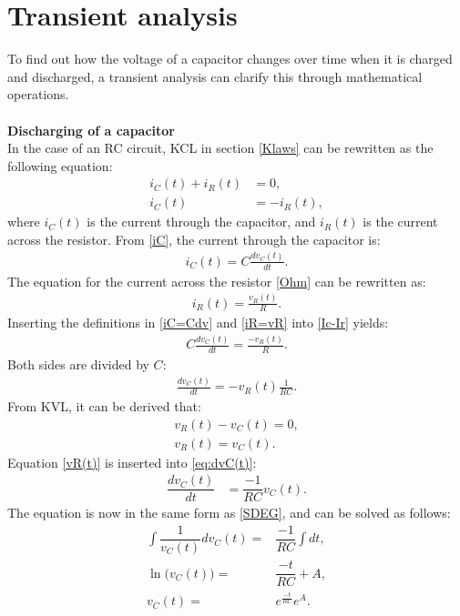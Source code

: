\section{Transient analysis}
\label{sec371}
To find out how the voltage of a capacitor changes over time when it is charged and discharged, a transient analysis can clarify this through mathematical operations.
\\
\\
\noindent\textbf{Discharging of a capacitor}\\
In the case of an RC circuit, KCL in section \ref{Klaws} can be rewritten as the following equation:
\begin{align}
i_{C}(t)+i_{R}(t)&=0, \nonumber \\
i_{C}(t)&= -i_{R}(t), \label{Ic-Ir}
\end{align}
where $i_C(t)$ is the current through the capacitor, and $i_R(t)$ is the current across the resistor. From \eqref{iC}, the current through the capacitor is:
\begin{align}
	i_C(t) = C\frac{dv_C(t)}{dt}.\label{iC=Cdv}
\end{align}
The equation for the current across the resistor \eqref{Ohm} can be rewritten as:
\begin{align}
	i_R(t) = \frac{v_R(t)}{R}. \label{iR=vR}
\end{align}
Inserting the definitions in \eqref{iC=Cdv} and \eqref{iR=vR} into \eqref{Ic-Ir} yields:
\begin{align*}
	C\frac{dv_C(t)}{dt} = \frac{-v_R(t)}{R}.
\end{align*}
Both sides are divided by $C$:
\begin{align}
	\frac{dv_C(t)}{dt} =-v_R(t) \frac{1}{RC}.
	\label{eq:dvC(t)}
\end{align}
From KVL, it can be derived that:
\begin{align}
	v_R(t) - v_C(t) = 0, \nonumber\\
	v_R(t) = v_C(t). \label{vR(t)}
\end{align}
Equation \eqref{vR(t)} is inserted into \eqref{eq:dvC(t)}:
\begin{align*}
	\dfrac{dv_C(t)}{dt} &= \dfrac{-1}{RC}v_C(t).
\end{align*}
The equation is now in the same form as \eqref{SDEG}, and can be solved as follows:
\begin{align}
\int \dfrac{1}{v_C(t)}dv_C(t) =& \dfrac{-1}{RC} \int dt, \nonumber \\
\ln\big(v_C(t)\big) =& \dfrac{-t}{RC} + A, \nonumber\\
v_C(t) =& e^{\frac{-t}{RC}}e^{A}.\label{V_eA}
\end{align}
